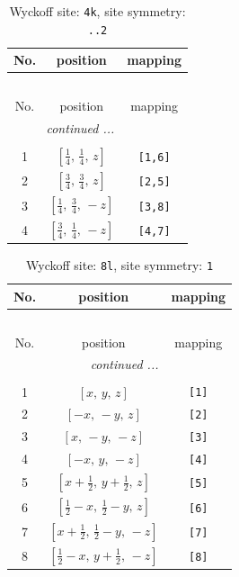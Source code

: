 \documentclass[fleqn,8pt]{jsarticle}
\begin{document}
\renewcommand{\arraystretch}{1.2}
\begin{longtable}{ccc}
\caption{Wyckoff site: {\tt 4k}, site symmetry: {\tt ..2}}
 \\
 \hline \hline
No. & position & mapping \\ \hline \endfirsthead

\multicolumn{2}{l}{\tablename\ \thetable{}} \\
 \hline \hline
No. & position & mapping \\ \hline \endhead

 \hline \hline
\multicolumn{2}{r}{\footnotesize\it continued ...} \\ \endfoot

 \hline \hline
\multicolumn{2}{r}{} \\ \endlastfoot

1 & $\left[ \frac{1}{4},\, \frac{1}{4},\, z \right]$ & {\tt [1,6]} \\ \hline
2 & $\left[ \frac{3}{4},\, \frac{3}{4},\, z \right]$ & {\tt [2,5]} \\ \hline
3 & $\left[ \frac{1}{4},\, \frac{3}{4},\, - z \right]$ & {\tt [3,8]} \\ \hline
4 & $\left[ \frac{3}{4},\, \frac{1}{4},\, - z \right]$ & {\tt [4,7]} \\
\end{longtable}
\renewcommand{\arraystretch}{1.2}
\begin{longtable}{ccc}
\caption{Wyckoff site: {\tt 8l}, site symmetry: {\tt 1}}
 \\
 \hline \hline
No. & position & mapping \\ \hline \endfirsthead

\multicolumn{2}{l}{\tablename\ \thetable{}} \\
 \hline \hline
No. & position & mapping \\ \hline \endhead

 \hline \hline
\multicolumn{2}{r}{\footnotesize\it continued ...} \\ \endfoot

 \hline \hline
\multicolumn{2}{r}{} \\ \endlastfoot

1 & $\left[ x,\, y,\, z \right]$ & {\tt [1]} \\ \hline
2 & $\left[ - x,\, - y,\, z \right]$ & {\tt [2]} \\ \hline
3 & $\left[ x,\, - y,\, - z \right]$ & {\tt [3]} \\ \hline
4 & $\left[ - x,\, y,\, - z \right]$ & {\tt [4]} \\ \hline
5 & $\left[ x + \frac{1}{2},\, y + \frac{1}{2},\, z \right]$ & {\tt [5]} \\ \hline
6 & $\left[ \frac{1}{2} - x,\, \frac{1}{2} - y,\, z \right]$ & {\tt [6]} \\ \hline
7 & $\left[ x + \frac{1}{2},\, \frac{1}{2} - y,\, - z \right]$ & {\tt [7]} \\ \hline
8 & $\left[ \frac{1}{2} - x,\, y + \frac{1}{2},\, - z \right]$ & {\tt [8]} \\
\end{longtable}
\end{document}
